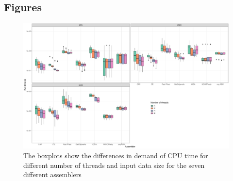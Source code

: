 \documentclass{bmcart}
\begin{document}
\begin{backmatter}



\section*{Figures}
\begin{figure}[h!]
  \includegraphics[width=\textwidth]{plots/comp_time_log.pdf}
  \caption{
  The boxplots show the differences in demand of CPU time for different number of threads and input data size for the seven different assemblers
  }
        \label{fig:performance_runtime}
      \end{figure}


\end{backmatter}
\end{document}
